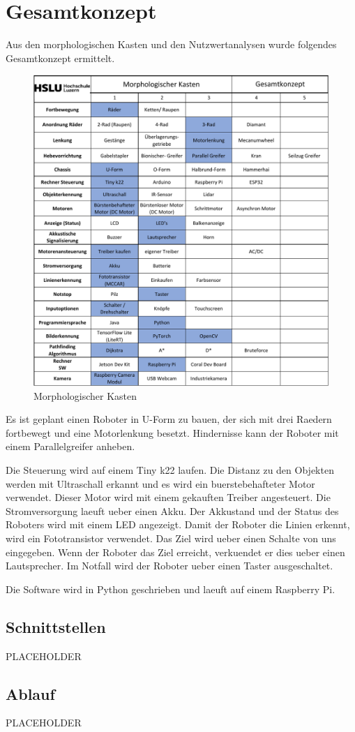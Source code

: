 \section{Gesamtkonzept}

Aus den morphologischen Kasten und den Nutzwertanalysen wurde folgendes Gesamtkonzept ermittelt. 

\begin{figure}[H]
\centering
\includegraphics[width=\textwidth]{assets/MK-Gesamt.pdf}
\caption{Morphologischer Kasten}
\label{fig:mk-all}
\end{figure}

Es ist geplant einen Roboter in U-Form zu bauen, der sich mit drei Raedern fortbewegt und eine Motorlenkung besetzt. Hindernisse kann der Roboter mit einem Parallelgreifer anheben.

Die Steuerung wird auf einem Tiny k22 laufen. Die Distanz zu den Objekten werden mit Ultraschall erkannt und es wird ein buerstebehafteter Motor verwendet. Dieser Motor wird mit einem gekauften Treiber angesteuert. Die Stromversorgung laeuft ueber einen Akku. Der Akkustand und der Status des Roboters wird mit einem LED angezeigt. Damit der Roboter die Linien erkennt, wird ein Fototransistor verwendet. Das Ziel wird ueber einen Schalte von uns eingegeben.
Wenn der Roboter das Ziel erreicht, verkuendet er dies ueber einen Lautsprecher. Im Notfall wird der Roboter ueber einen Taster ausgeschaltet.

Die Software wird in Python geschrieben und laeuft auf einem Raspberry Pi.

\subsection{Schnittstellen}

PLACEHOLDER

\subsection{Ablauf}

PLACEHOLDER
